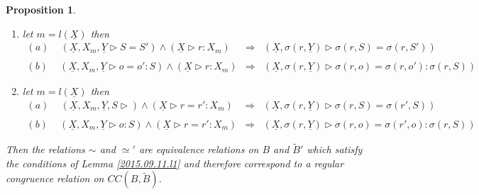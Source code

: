 \documentclass[11pt]{article}
\newtheorem{proposition}{Proposition}[subsection]
\newcommand{\uu}{\underline}
\newcommand{\wt}{\widetilde}
\newcommand{\spc}{{\,\,\,\,\,\,\,}}
\newcommand{\impl}{{\Rightarrow}}
\begin{document}
\begin{proposition}
\begin{enumerate}
$$\begin{array}{lcl}
(a)\spc (\uu{X},X_m\rhd)\wedge(\uu{X},\uu{Y}\rhd S=S')&\impl&(\uu{X},X_m,\partial^{m}(\uu{Y})\rhd \partial^{m}(S)=\partial^{m}(S'))\\\\
(b)\spc (\uu{X},X_m\rhd)\wedge(\uu{X},\uu{Y}\rhd o=o':S)&\impl&(\uu{X},X_m,\partial^{m}(\uu{Y})\rhd \partial^{m}(o)=\partial^{m}(o'):\partial^{m}(S))
\end{array}
$$
%
\item let $m=l(\uu{X})$ then 
%
$$
\begin{array}{lcl}
(a)\spc (\uu{X},X_m,\uu{Y}\rhd S=S')\wedge(\uu{X}\rhd r:X_m)&\impl&
(\uu{X},\sigma(r,\uu{Y})\rhd \sigma(r,S)=\sigma(r,S'))\\\\
(b)\spc (\uu{X},X_m,\uu{Y}\rhd o=o':S)\wedge(\uu{X}\rhd r:X_m)&\impl&(\uu{X},\sigma(r,\uu{Y})\rhd \sigma(r,o)=\sigma(r,o'):\sigma(r,S))
\end{array}
$$
%
\item let $m=l(\uu{X})$ then 
%
$$
\begin{array}{lcl}
(a)\spc (\uu{X},X_m,\uu{Y},S\rhd)\wedge(\uu{X}\rhd r=r':X_m)&\impl&(\uu{X},\sigma(r,\uu{Y})\rhd \sigma(r,S)=\sigma(r',S))\\\\
(b)\spc (\uu{X},X_m,\uu{Y}\rhd o:S)\wedge(\uu{X}\rhd r=r':X_m)&\impl&(\uu{X},\sigma(r,\uu{Y})\rhd \sigma(r,o)=\sigma(r',o):\sigma(r,S))
\end{array}
$$
\end{enumerate}
%
Then the relations $\sim$ and $\simeq'$ are equivalence relations on $B$ and $\wt{B}'$ which satisfy the conditions of Lemma \ref{2015.09.11.l1} and therefore correspond to a regular congruence relation on $CC(B,\wt{B})$. 
\end{proposition}
%
\end{document}
